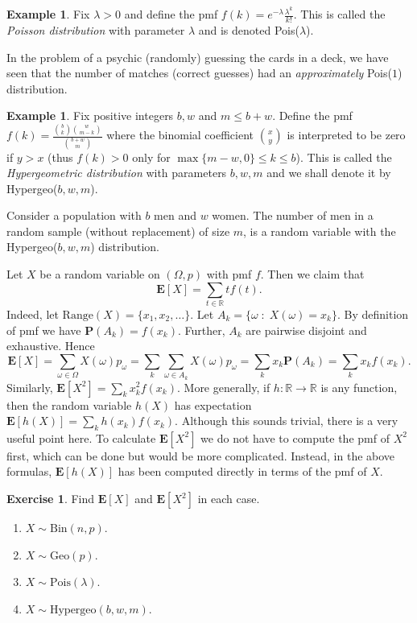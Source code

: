 \documentclass[preprint,  11pt]{amsart}
\newcommand{\parag}[1]{\vspace{4mm}\noindent{\bfseries #1}}
\theoremstyle{plain} %
\theoremstyle{definition} %
\newtheorem{exercise}[theorem]{Exercise}
\newtheorem{example}[theorem]{Example}
\begin{document}
\begin{example} Fix $\lambda>0$ and define the pmf $f(k)=e^{-\lambda}\frac{\lambda^{k}}{k!}$. This is called the {\em Poisson  distribution} with parameter $\lambda$ and is denoted Pois($\lambda$).

In the problem of a psychic (randomly) guessing the cards in a deck, we have seen that the number of matches (correct guesses) had an {\em approximately} Pois($1$) distribution.
\end{example}

\begin{example} Fix positive integers $b,w$ and $m\le b+w$. Define the pmf  $f(k)=\frac{\binom{b}{k}\binom{w}{m-k}}{\binom{b+w}{m}}$ where the binomial coefficient $\binom{x}{y}$ is interpreted to be zero if $y>x$ (thus $f(k)>0$ only for $\max\{m-w,0\}\le k\le b$). This is called the {\em Hypergeometric distribution} with parameters $b,w,m$ and we shall denote it by  Hypergeo($b,w,m$).

Consider a population with $b$ men and $w$ women. The number of men in a random sample (without replacement) of size $m$, is a random variable with the Hypergeo($b,w,m$) distribution.
\end{example}

\parag{Computing expectations from the pmf} Let $X$ be a random variable on $(\Omega,p)$ with pmf $f$. Then we claim that
$$
\mathbf{E}[X] = \sum_{t\in \mathbb{R}}tf(t).
$$
Indeed, let $\mbox{Range}(X)=\{x_{1},x_{2},\ldots\}$. Let $A_{k}=\{\omega{\; : \;} X(\omega)=x_{k}\}$. By definition of pmf we have $\mathbf{P}(A_{k})=f(x_{k})$. Further, $A_{k}$ are pairwise disjoint and exhaustive. Hence 
$$
\mathbf{E}[X] = \sum_{\omega\in \Omega}X(\omega)p_{\omega} = \sum_{k}\sum_{\omega\in A_{k}}X(\omega)p_{\omega} = \sum_{k}x_{k}\mathbf{P}(A_{k})=\sum_{k}x_{k}f(x_{k}).
$$
Similarly, $\mathbf{E}[X^{2}]=\sum_{k}x_{k}^{2}f(x_{k})$. More generally, if $h:\mathbb{R}\rightarrow \mathbb{R}$ is any function, then the random variable $h(X)$ has expectation $\mathbf{E}[h(X)]=\sum_{k}h(x_{k})f(x_{k})$. Although this sounds trivial, there is a very useful point here. To calculate $\mathbf{E}[X^{2}]$ we do not have to compute the pmf of $X^{2}$ first, which can be done but would be more complicated. Instead, in the above formulas, $\mathbf{E}[h(X)]$ has been computed directly in terms of the pmf of $X$.
\begin{exercise} Find $\mathbf{E}[X]$ and $\mathbf{E}[X^{2}]$ in each case.
\begin{enumerate}\setlength\itemsep{6pt}
\item $X\sim \mbox{Bin}(n,p)$.
\item $X\sim \mbox{Geo}(p)$.
\item $X\sim \mbox{Pois}(\lambda)$.
\item $X\sim \mbox{Hypergeo}(b,w,m)$.
\end{enumerate}
\end{exercise}
\end{document}
